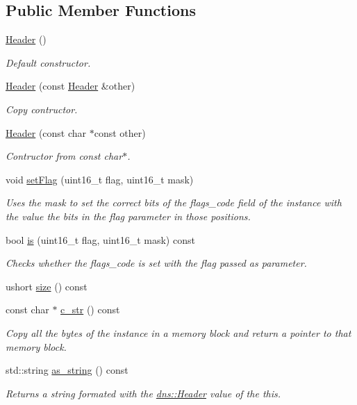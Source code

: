 \subsection*{Public Member Functions}
\begin{DoxyCompactItemize}
\item 
\hyperlink{structdns_1_1Header_ab15c37ac6b02f5186082ea6a2f40edc0}{Header} ()
\begin{DoxyCompactList}\small\item\em Default constructor. \end{DoxyCompactList}\item 
\hyperlink{structdns_1_1Header_ab7d03fd2cec0659afe0df11f59a3b4da}{Header} (const \hyperlink{structdns_1_1Header}{Header} \&other)
\begin{DoxyCompactList}\small\item\em Copy contructor. \end{DoxyCompactList}\item 
\hyperlink{structdns_1_1Header_a5195a1241799e64eea7c5061f81a7c4e}{Header} (const char $\ast$const other)
\begin{DoxyCompactList}\small\item\em Contructor from const char$\ast$. \end{DoxyCompactList}\item 
void \hyperlink{structdns_1_1Header_ac8629bfb54bfe73b2a85ad3ab04e4561}{set\+Flag} (uint16\+\_\+t flag, uint16\+\_\+t mask)
\begin{DoxyCompactList}\small\item\em Uses the mask to set the correct bits of the flags\+\_\+code field of the instance with the value the bits in the flag parameter in those positions. \end{DoxyCompactList}\item 
bool \hyperlink{structdns_1_1Header_aee9ceec6332d282f329b967cef1d285c}{is} (uint16\+\_\+t flag, uint16\+\_\+t mask) const 
\begin{DoxyCompactList}\small\item\em Checks whether the flags\+\_\+code is set with the flag passed as parameter. \end{DoxyCompactList}\item 
ushort \hyperlink{structdns_1_1Header_abffe9b9ee5acba609e687535354ba6c8}{size} () const 
\item 
const char $\ast$ \hyperlink{structdns_1_1Header_a9b1a9610e54c5c0992fe6e756c8fadbb}{c\+\_\+str} () const 
\begin{DoxyCompactList}\small\item\em Copy all the bytes of the instance in a memory block and return a pointer to that memory block. \end{DoxyCompactList}\item 
std\+::string \hyperlink{structdns_1_1Header_a8f7e8d1e1e08f9b6734a83fafa4aca7f}{as\+\_\+string} () const 
\begin{DoxyCompactList}\small\item\em Returns a string formated with the \hyperlink{structdns_1_1Header}{dns\+::\+Header} value of the this. \end{DoxyCompactList}\end{DoxyCompactItemize}
